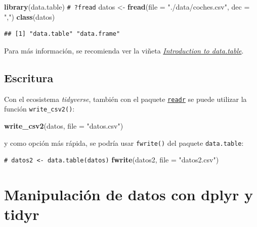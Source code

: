 \documentclass[
]{book}
\newenvironment{Shaded}{\begin{snugshade}}{\end{snugshade}}
\newcommand{\AttributeTok}[1]{\textcolor[rgb]{0.13,0.29,0.53}{#1}}
\newcommand{\CommentTok}[1]{\textcolor[rgb]{0.56,0.35,0.01}{\textit{#1}}}
\newcommand{\FunctionTok}[1]{\textcolor[rgb]{0.13,0.29,0.53}{\textbf{#1}}}
\newcommand{\NormalTok}[1]{#1}
\newcommand{\OtherTok}[1]{\textcolor[rgb]{0.56,0.35,0.01}{#1}}
\newcommand{\StringTok}[1]{\textcolor[rgb]{0.31,0.60,0.02}{#1}}
\theoremstyle{break}
\theoremstyle{nonumberplain}
\renewcommand{\CommentTok}[1]{\textcolor[rgb]{0.41,0.41,0.41}{\texttt{#1}}}
\begin{document}
\begin{Shaded}
\begin{Highlighting}[]
\FunctionTok{library}\NormalTok{(data.table)}
\CommentTok{\# ?fread}
\NormalTok{datos }\OtherTok{\textless{}{-}} \FunctionTok{fread}\NormalTok{(}\AttributeTok{file =} \StringTok{"./data/coches.csv"}\NormalTok{, }\AttributeTok{dec =} \StringTok{","}\NormalTok{)}
\FunctionTok{class}\NormalTok{(datos) }
\end{Highlighting}
\end{Shaded}

\begin{verbatim}
## [1] "data.table" "data.frame"
\end{verbatim}

Para más información, se recomienda ver la viñeta \href{https://rdatatable.gitlab.io/data.table/articles/datatable-intro.html}{\emph{Introduction to data.table}}.

\subsection{Escritura}\label{writer}

Con el ecosistema \emph{tidyverse}, también con el paquete \href{https://readr.tidyverse.org}{\texttt{readr}} se puede utilizar la función \texttt{write\_csv2()}:

\begin{Shaded}
\begin{Highlighting}[]
\FunctionTok{write\_csv2}\NormalTok{(datos, }\AttributeTok{file =} \StringTok{"datos.csv"}\NormalTok{)}
\end{Highlighting}
\end{Shaded}

y como opción más rápida, se podría usar \texttt{fwrite()} del paquete \texttt{data.table}:

\begin{Shaded}
\begin{Highlighting}[]
\CommentTok{\# datos2 \textless{}{-} data.table(datos)}
\FunctionTok{fwrite}\NormalTok{(datos2, }\AttributeTok{file =} \StringTok{"datos2.csv"}\NormalTok{)}
\end{Highlighting}
\end{Shaded}

\section{Manipulación de datos con dplyr y tidyr}\label{dplyr}
\end{document}
